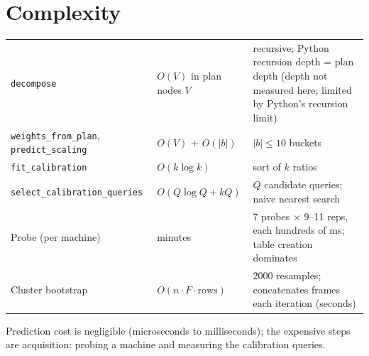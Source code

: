 \section{Complexity}
\begin{center}\small
\begin{tabularx}{\textwidth}{@{}L{4.3cm}L{3.6cm}Y@{}}
\toprule {} &  & \\ \midrule
\texttt{decompose} & $O(V)$ in plan nodes $V$ & recursive; Python recursion depth = plan depth (depth not measured here; limited by Python's recursion limit)\\
\texttt{weights\_from\_plan}, \texttt{predict\_scaling} & $O(V)$ + $O(|b|)$ & $|b|\le10$ buckets\\
\texttt{fit\_calibration} & $O(k\log k)$ & sort of $k$ ratios\\
\texttt{select\_calibration\_queries} & $O(Q\log Q+kQ)$ & $Q$ candidate queries; naive nearest search\\
Probe (per machine) & minutes & 7 probes $\times$ 9--11 reps, each hundreds of ms; table creation dominates\\
Cluster bootstrap & $O(n\cdot F\cdot\text{rows})$ & 2000 resamples; concatenates frames each iteration (seconds)\\
\bottomrule
\end{tabularx}
\end{center}
Prediction cost is negligible (microseconds to milliseconds); the expensive steps are acquisition: probing a machine and
measuring the calibration queries.
